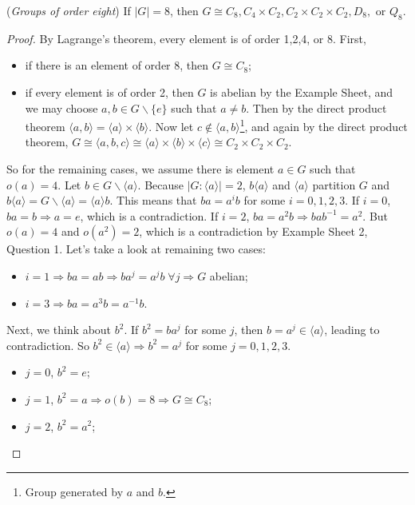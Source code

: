 \documentclass[10pt, a4paper, twoside]{report}
\begin{document}
\begin{lemma}
    (\emph{Groups of order eight}) If \(|G|=8\), then \(G\cong C_8,C_4\times C_2,C_2\times C_2\times C_2,D_8,\text{ or }Q_8\).
\end{lemma}
\begin{proof}
    By Lagrange's theorem, every element is of order 1,2,4, or 8. First,
    \begin{itemize}
        \item if there is an element of order 8, then \(G\cong C_8\);
        \item if every element is of order 2, then \(G\) is abelian by the Example Sheet, and we may choose \(a,b\in G\backslash\{e\}\) such that \(a\neq b\). Then by the direct product theorem \(\langle a,b\rangle=\langle a\rangle\times\langle b\rangle\). Now let \(c\notin\langle a,b\rangle\)\footnote{Group generated by \(a\) and \(b\).}, and again by the direct product theorem, \(G\cong\langle a,b,c\rangle\cong\langle a\rangle\times\langle b\rangle\times\langle c\rangle\cong C_2\times C_2\times C_2\).
    \end{itemize}
    So for the remaining cases, we assume there is element \(a\in G\) such that \(o(a)=4\). Let \(b\in G\backslash\langle a\rangle\). Because \(|G:\langle a\rangle|=2\), \(b\langle a\rangle\) and \(\langle a\rangle\) partition \(G\) and \(b\langle a\rangle=G\backslash\langle a\rangle=\langle a\rangle b\). This means that \(ba=a^ib\) for some \(i=0,1,2,3\). If \(i=0\), \(ba=b\Rightarrow a=e\), which is a contradiction. If \(i=2\), \(ba=a^2b\Rightarrow bab^{-1}=a^2\). But \(o(a)=4\) and \(o(a^2)=2\), which is a contradiction by Example Sheet 2, Question 1. Let's take a look at remaining two cases:
    \begin{itemize}
        \item \(i=1\Rightarrow ba=ab\Rightarrow ba^j=a^jb\;\forall j\Rightarrow G\) abelian;
        \item \(i=3\Rightarrow ba=a^3b=a^{-1}b\).
    \end{itemize} 
    Next, we think about \(b^2\). If \(b^2=ba^j\) for some \(j\), then \(b=a^j\in\langle a\rangle\), leading to contradiction. So \(b^2\in\langle a\rangle\Rightarrow b^2=a^j\) for some \(j=0,1,2,3\).
    \begin{itemize}
        \item \(j=0\), \(b^2=e\);
        \item \(j=1\), \(b^2=a\Rightarrow o(b)=8\Rightarrow G\cong C_8\);
        \item \(j=2\), \(b^2=a^2\);

\end{itemize}
\end{proof}
\end{document}
